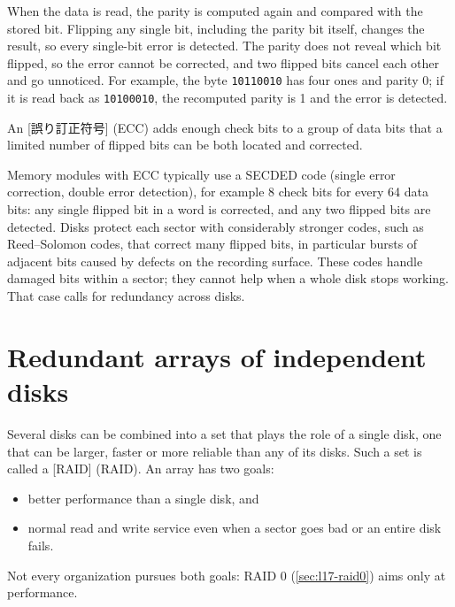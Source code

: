 \documentclass[../main.tex]{subfiles}
\begin{document}
When the data is read, the parity is computed again and compared with the
stored bit.  Flipping any single bit, including the parity bit itself,
changes the result, so every single-bit error is detected.  The parity does
not reveal which bit flipped, so the error cannot be corrected, and two
flipped bits cancel each other and go unnoticed.  For example, the byte
\texttt{10110010} has four ones and parity 0; if it is read back as
\texttt{10100010}, the recomputed parity is 1 and the error is detected.

\begin{definition}
  An [誤り訂正符号]
  (ECC) adds enough check bits to a group of data bits that a limited
  number of flipped bits can be both located and corrected.
\end{definition}

Memory modules with ECC typically use a SECDED code (single error
correction, double error detection), for example 8 check bits for every 64
data bits: any single flipped bit in a word is corrected, and any two
flipped bits are detected.  Disks protect each sector with considerably
stronger codes, such as Reed--Solomon codes, that correct many flipped bits,
in particular bursts of adjacent bits caused by defects on the recording
surface.  These codes handle damaged bits within a sector; they cannot help
when a whole disk stops working.  That case calls for redundancy across
disks.

\section{Redundant arrays of independent disks}
\label{sec:l17-raid}

Several disks can be combined into a set that plays the role of a single
disk, one that can be larger, faster or more reliable than any of its
disks.  Such a
set is called a [RAID] (RAID).
An array has two goals:
\begin{itemize}
  \item better performance than a single disk, and
  \item normal read and write service even when a sector goes bad or an
    entire disk fails.
\end{itemize}
Not every organization pursues both goals: RAID 0 (\cref{sec:l17-raid0})
aims only at performance.
\end{document}
